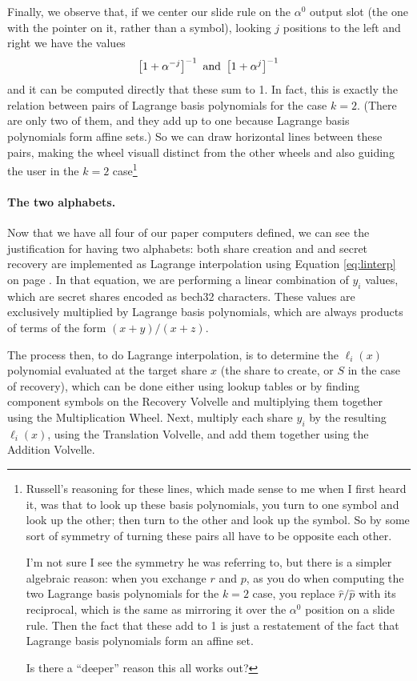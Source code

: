\documentclass[letterpaper]{article}
\theoremstyle{xxx}
\theoremstyle{evil}
\theoremstyle{yyy}
\theoremstyle{plain}
\theoremstyle{zzz}
\begin{document}
Finally, we observe that, if we center our slide rule on the $\alpha^0$ output
slot (the one with the pointer on it, rather than a symbol), looking $j$ positions
to the left and right we have the values
\[ \left[ 1 + \alpha^{-j} \right]^{-1} \textnormal{ and } \left[ 1 + \alpha^j \right]^{-1}  \]
and it can be computed directly that these sum to 1.
In fact, this is exactly the relation between pairs of Lagrange basis polynomials
for the case $k=2$. (There are only two of them, and they add up to one because
Lagrange basis polynomials form affine sets.) So we can draw horizontal lines
between these pairs, making the wheel visuall distinct from the other wheels and
also guiding the user in the $k=2$ case\footnote{Russell's reasoning for these
lines, which made sense to me when I first heard it, was that to look up these
basis polynomials, you turn to one symbol and look up the other; then turn to
the other and look up the symbol. So by some sort of symmetry of turning these
pairs all have to be opposite each other.

I'm not sure I see the symmetry he was referring to, but there is a simpler
algebraic reason: when you exchange $r$ and $p$, as you do when computing the
two Lagrange basis polynomials for the $k=2$ case, you replace $\hat{r}/\hat{p}$
with its reciprocal, which is the same as mirroring it over the $\alpha^0$
position on a slide rule. Then the fact that these add to 1 is just a restatement
of the fact that Lagrange basis polynomials form an affine set.

Is there a ``deeper'' reason this all works out?}


\paragraph{The two alphabets.}
Now that we have all four of our paper computers defined,
we can see the justification for having two alphabets: both share creation and
and secret recovery are implemented as Lagrange interpolation using Equation
\eqref{eq:linterp} on page \pageref{eq:linterp}. In that equation, we are performing
a linear combination of $y_i$ values, which are secret shares encoded as bech32
characters. These values are exclusively multiplied by Lagrange basis polynomials,
which are always products of terms of the form $(x + y)/(x + z)$.

The process then, to do Lagrange interpolation, is to determine the $\ell_i(x)$
polynomial evaluated at the target share $x$ (the share to create, or $S$ in the case
of recovery), which can be done either using lookup tables or by finding component
symbols on the Recovery Volvelle and multiplying them together using the Multiplication
Wheel. Next, multiply each share $y_i$ by the resulting $\ell_i(x)$, using the Translation
Volvelle, and add them together using the Addition Volvelle.
\end{document}
